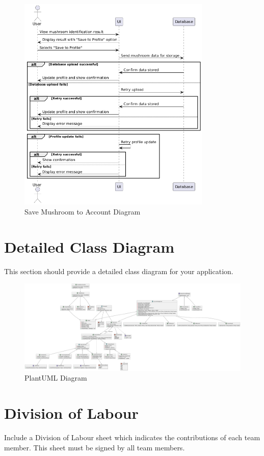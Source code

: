 \documentclass[]{article}
\begin{document}
\begin{figure}[h]
    \begin{minipage}[b]{\textwidth}
        \centering
        \includegraphics[width=0.82\textwidth]{savemushroom.png}
        \caption{Save Mushroom to Account Diagram}
        \label{fig:recipe}
    \end{minipage}
\end{figure}

\clearpage
\section{Detailed Class Diagram}
\label{sec:detailed_class_diagram}
This section should provide a detailed class diagram for your application.
\begin{figure}[h]
    \centering
    \includegraphics[width=\textwidth]{DetailedClassDiagram4.pdf}
    \caption{PlantUML Diagram}
\end{figure}

\clearpage
\appendix
\section{Division of Labour}
\label{sec:division_of_labour}
Include a Division of Labour sheet which indicates the contributions of each team member. This sheet must be signed by all team members.

\newpage
\end{document}
